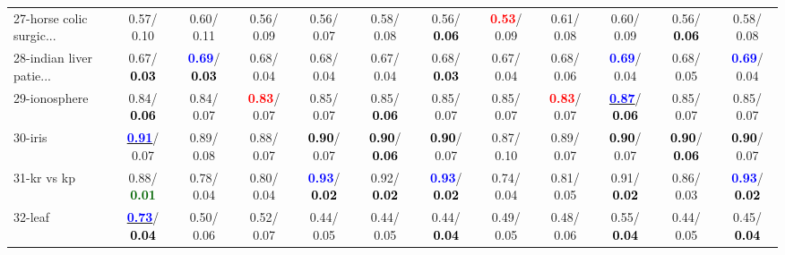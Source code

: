 \begin{table}[h]
\begin{center}
{\begin{tabular}{lc|c|c|c|c|c|c|c|c|c|c}
27-horse colic surgic... &   0.57/  0.10 &   0.60/  0.11 &   0.56/  0.09 &   0.56/  0.07 &   0.58/  0.08 &   0.56/\textcolor{black}{\textbf{  0.06}} & \textcolor{red}{\textbf{  0.53}}/  0.09 &   0.61/  0.08 &   0.60/  0.09 &   0.56/\textcolor{black}{\textbf{  0.06}} &   0.58/  0.08 \\
28-indian liver patie... &   0.67/\textcolor{black}{\textbf{  0.03}} & \textcolor{blue}{\textbf{  0.69}}/\textcolor{black}{\textbf{  0.03}} &   0.68/  0.04 &   0.68/  0.04 &   0.67/  0.04 &   0.68/\textcolor{black}{\textbf{  0.03}} &   0.67/  0.04 &   0.68/  0.06 & \textcolor{blue}{\textbf{  0.69}}/  0.04 &   0.68/  0.05 & \textcolor{blue}{\textbf{  0.69}}/  0.04 \\ \hline
29-ionosphere &   0.84/\textcolor{black}{\textbf{  0.06}} &   0.84/  0.07 & \textcolor{red}{\textbf{  0.83}}/  0.07 &   0.85/  0.07 &   0.85/\textcolor{black}{\textbf{  0.06}} &   0.85/  0.07 &   0.85/  0.07 & \textcolor{red}{\textbf{  0.83}}/  0.07 & \underline{\textcolor{blue}{\textbf{  0.87}}}/\textcolor{black}{\textbf{  0.06}} &   0.85/  0.07 &   0.85/  0.07 \\
30-iris & \underline{\textcolor{blue}{\textbf{  0.91}}}/  0.07 &   0.89/  0.08 &   0.88/  0.07 & \textcolor{black}{\textbf{  0.90}}/  0.07 & \textcolor{black}{\textbf{  0.90}}/\textcolor{black}{\textbf{  0.06}} & \textcolor{black}{\textbf{  0.90}}/  0.07 &   0.87/  0.10 &   0.89/  0.07 & \textcolor{black}{\textbf{  0.90}}/  0.07 & \textcolor{black}{\textbf{  0.90}}/\textcolor{black}{\textbf{  0.06}} & \textcolor{black}{\textbf{  0.90}}/  0.07 \\
31-kr vs kp &   0.88/\textcolor{darkgreen}{\textbf{  0.01}} &   0.78/  0.04 &   0.80/  0.04 & \textcolor{blue}{\textbf{  0.93}}/\textcolor{black}{\textbf{  0.02}} &   0.92/\textcolor{black}{\textbf{  0.02}} & \textcolor{blue}{\textbf{  0.93}}/\textcolor{black}{\textbf{  0.02}} &   0.74/  0.04 &   0.81/  0.05 &   0.91/\textcolor{black}{\textbf{  0.02}} &   0.86/  0.03 & \textcolor{blue}{\textbf{  0.93}}/\textcolor{black}{\textbf{  0.02}} \\
32-leaf & \underline{\textcolor{blue}{\textbf{  0.73}}}/\textcolor{black}{\textbf{  0.04}} &   0.50/  0.06 &   0.52/  0.07 &   0.44/  0.05 &   0.44/  0.05 &   0.44/\textcolor{black}{\textbf{  0.04}} &   0.49/  0.05 &   0.48/  0.06 &   0.55/\textcolor{black}{\textbf{  0.04}} &   0.44/  0.05 &   0.45/\textcolor{black}{\textbf{  0.04}} \\\end{tabular}}\label{stratsBalAcc0aNB}
\end{center}
\end{table}

